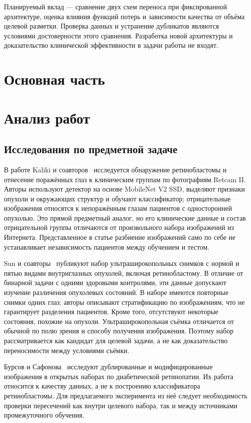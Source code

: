 \documentclass{misisarticle}
\begin{document}
Планируемый вклад --- сравнение двух схем переноса при фиксированной архитектуре, оценка влияния функций потерь и зависимости качества от объёма целевой разметки. Проверка данных и устранение дубликатов являются условиями достоверности этого сравнения. Разработка новой архитектуры и доказательство клинической эффективности в задачи работы не входят.



\section{Основная часть}

\section{Анализ работ}
\subsection{Исследования по предметной задаче}
В работе Kaliki и соавторов~\cite{kaliki2023} исследуется обнаружение ретинобластомы и отнесение поражённых глаз к клиническим группам по фотографиям Retcam II. Авторы используют детектор на основе MobileNet V2 SSD, выделяют признаки опухоли и окружающих структур и обучают классификатор; отрицательные изображения относятся к непоражённым глазам пациентов с односторонней опухолью. Это прямой предметный аналог, но его клинические данные и состав отрицательной группы отличаются от произвольного набора изображений из Интернета. Представленное в статье разбиение изображений само по себе не устанавливает независимость пациентов между обучением и тестом.

Sun и соавторы~\cite{sun2025} публикуют набор ультраширокопольных снимков с нормой и пятью видами внутриглазных опухолей, включая ретинобластому. В отличие от бинарной задачи с одними здоровыми контролями, эти данные допускают изучение различения опухолевых состояний. В наборе имеются повторные снимки одних глаз; авторы описывают стратификацию по изображениям, что не гарантирует разделения пациентов. Кроме того, отсутствуют некоторые состояния, похожие на опухоли. Ультраширокопольная съёмка отличается от обычной по полю зрения и способу получения изображения. Поэтому набор рассматривается как кандидат для целевой задачи, а не как доказательство переносимости между условиями съёмки.

Бурсов и Сафонова~\cite{bursov2025} исследуют дублированные и модифицированные изображения в открытых наборах по диабетической ретинопатии. Их работа относится к качеству данных, а не к построению классификатора ретинобластомы. Для предлагаемого эксперимента из неё следует необходимость проверки пересечений как внутри целевого набора, так и между источниками промежуточного обучения.
\end{document}
